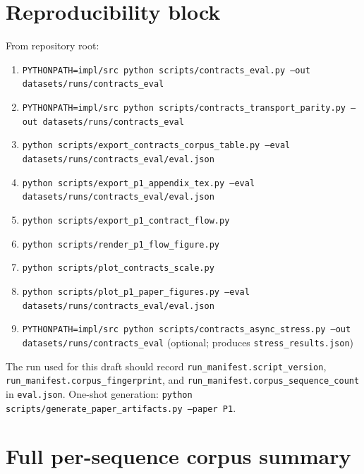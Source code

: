 \documentclass[11pt]{article}
\begin{document}
\appendix

\section{Reproducibility block}

From repository root:
\begin{enumerate}[leftmargin=1.5em]
\item \texttt{PYTHONPATH=impl/src python scripts/contracts\_eval.py --out datasets/runs/contracts\_eval}
\item \texttt{PYTHONPATH=impl/src python scripts/contracts\_transport\_parity.py --out datasets/runs/contracts\_eval}
\item \texttt{python scripts/export\_contracts\_corpus\_table.py --eval datasets/runs/contracts\_eval/eval.json}
\item \texttt{python scripts/export\_p1\_appendix\_tex.py --eval datasets/runs/contracts\_eval/eval.json}
\item \texttt{python scripts/export\_p1\_contract\_flow.py}
\item \texttt{python scripts/render\_p1\_flow\_figure.py}
\item \texttt{python scripts/plot\_contracts\_scale.py}
\item \texttt{python scripts/plot\_p1\_paper\_figures.py --eval datasets/runs/contracts\_eval/eval.json}
\item \texttt{PYTHONPATH=impl/src python scripts/contracts\_async\_stress.py --out datasets/runs/contracts\_eval} (optional; produces \texttt{stress\_results.json})
\end{enumerate}

The run used for this draft should record \texttt{run\_manifest.script\_version}, \texttt{run\_manifest.corpus\_fingerprint}, and \texttt{run\_manifest.corpus\_sequence\_count} in \texttt{eval.json}. One-shot generation: \texttt{python scripts/generate\_paper\_artifacts.py --paper P1}.

\section{Full per-sequence corpus summary}

\end{document}
